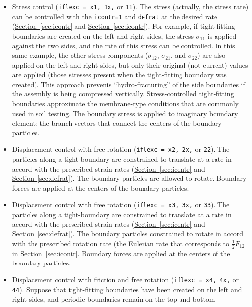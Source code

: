 \documentclass[letterpaper,11pt]{article}
\begin{document}
\begin{itemize}
\item
Stress control (\texttt{iflexc = x1, 1x,} or \texttt{11}).
The stress (actually, the stress rate) can be controlled with
the \texttt{icontr=1} and \texttt{defrat} at the desired rate
(\hyperref[sec:icontr]{Section~\ref*{sec:icontr}} 
and \hyperref[sec:icontr]{Section~\ref*{sec:icontr}}).
For example, if tight-fitting boundaries are created on the left and
right sides, the stress $\sigma_{11}$ is applied against the two sides,
and the rate of this stress can be controlled.
In this same example, the other stress components ($\sigma_{12}$,
$\sigma_{21}$, and $\sigma_{22}$) are also applied on the left and right
sides, but only their original (not current) values are applied 
(those stresses present when the tight-fitting boundary was created).
This approach prevents ``hydro-fracturing'' of the side boundaries if
the assembly is being compressed vertically.
Stress-controlled tight-fitting boundaries approximate the membrane-type
conditions that are commonly used in soil testing.
The boundary stress is applied to imaginary boundary element: 
the branch vectors that connect the centers of the boundary particles.
\item
Displacement control with free rotation 
(\texttt{iflexc = x2, 2x,} or \texttt{22}).
The particles along a tight-boundary are constrained to translate at
a rate in accord with the prescribed strain rates
(\hyperref[sec:icontr]{Section~\ref*{sec:icontr}}
and \hyperref[sec:defrat]{Section~\ref*{sec:defrat}}).
The boundary particles are allowed to rotate.
Boundary forces are applied at the centers of the boundary particles.
\item
Displacement control with free rotation
(\texttt{iflexc = x3, 3x,} or \texttt{33}).
The particles along a tight-boundary are constrained to translate at
a rate in accord with the prescribed strain rates
(\hyperref[sec:icontr]{Section~\ref*{sec:icontr}}
and \hyperref[sec:defrat]{Section~\ref*{sec:defrat}}).
The boundary particles constrained to rotate in accord with the
prescribed rotation rate (the Eulerian rate that corresponds
to $\frac{1}{2}F_{12}$ in
\hyperref[sec:icontr]{Section~\ref*{sec:icontr}}.
Boundary forces are applied at the centers of the boundary particles.
\item
Displacement control with friction and free rotation
(\texttt{iflexc = x4, 4x,} or \texttt{44}).
Suppose that tight-fitting boundaries have been created on the left
and right sides, and periodic boundaries remain on the top and bottom

\end{itemize}
\end{document}
